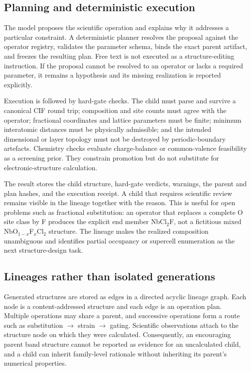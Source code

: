 \subsection{Planning and deterministic execution}

The model proposes the scientific operation and explains why it addresses a particular constraint.  A deterministic planner resolves the proposal against the operator registry, validates the parameter schema, binds the exact parent artifact, and freezes the resulting plan.  Free text is not executed as a structure-editing instruction.  If the proposal cannot be resolved to an operator or lacks a required parameter, it remains a hypothesis and its missing realization is reported explicitly.

Execution is followed by hard-gate checks.  The child must parse and survive a canonical CIF round trip; composition and site counts must agree with the operator; fractional coordinates and lattice parameters must be finite; minimum interatomic distances must be physically admissible; and the intended dimensional or layer topology must not be destroyed by periodic-boundary artefacts.  Chemistry checks evaluate charge-balance or common-valence feasibility as a screening prior.  They constrain promotion but do not substitute for electronic-structure calculation.

The result stores the child structure, hard-gate verdicts, warnings, the parent and plan hashes, and the execution receipt.  A child that requires scientific review remains visible in the lineage together with the reason.  This is useful for open problems such as fractional substitution: an operator that replaces a complete O site class by F produces the explicit end member NbCl$_2$F, not a fictitious mixed NbO$_{1-x}$F$_x$Cl$_2$ structure.  The lineage makes the realized composition unambiguous and identifies partial occupancy or supercell enumeration as the next structure-design task.

\subsection{Lineages rather than isolated generations}

Generated structures are stored as edges in a directed acyclic lineage graph.  Each node is a content-addressed structure and each edge is an operation plan.  Multiple operations may share a parent, and successive operations form a route such as substitution $\rightarrow$ strain $\rightarrow$ gating.  Scientific observations attach to the structure node on which they were calculated.  Consequently, an encouraging parent band structure cannot be reported as evidence for an uncalculated child, and a child can inherit family-level rationale without inheriting its parent's numerical properties.
